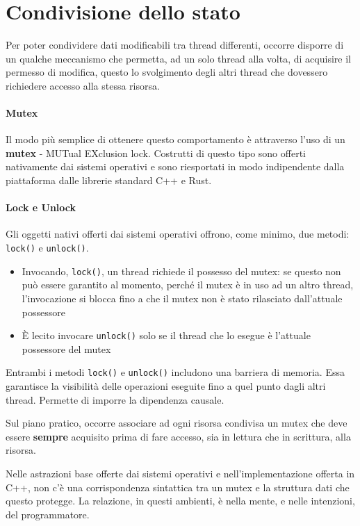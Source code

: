 \section{Condivisione dello stato}

Per poter condividere dati modificabili tra thread differenti, occorre disporre
di un qualche meccanismo che permetta, ad un solo thread alla volta, di
acquisire il permesso di modifica, questo lo svolgimento degli altri thread
che dovessero richiedere accesso alla stessa risorsa.


\paragraph{Mutex}
Il modo più semplice di ottenere questo comportamento è attraverso l'uso di un \textbf{mutex} -
MUTual EXclusion lock.
Costrutti di questo tipo sono offerti nativamente dai sistemi operativi e sono
riesportati in modo indipendente dalla piattaforma dalle librerie standard C++ e
Rust.

\paragraph{Lock e Unlock}

Gli oggetti nativi offerti dai sistemi operativi offrono, come minimo, due metodi: \verb|lock()|
e \verb|unlock()|.

\begin{itemize}
  \item Invocando, \verb|lock()|, un thread richiede il possesso del mutex: se questo non
        può essere garantito al momento, perché il mutex è in uso ad un altro thread,
        l'invocazione si blocca fino a che il mutex non è stato rilasciato
        dall'attuale possessore
  \item È lecito invocare \verb|unlock()| solo se il thread che lo esegue è
        l'attuale possessore del mutex
\end{itemize}


Entrambi i metodi \verb|lock()| e \verb|unlock()| includono una barriera di memoria.
Essa garantisce la visibilità delle operazioni eseguite fino a quel punto dagli
altri thread. Permette di imporre la dipendenza causale.

Sul piano pratico, occorre associare ad ogni risorsa condivisa un mutex che deve essere
\textbf{sempre} acquisito prima di fare accesso, sia in lettura che in scrittura, alla risorsa.


Nelle astrazioni base offerte dai sistemi operativi e nell'implementazione
offerta in C++, non c'è una corrispondenza sintattica tra un mutex e la
struttura dati che questo protegge. La relazione, in questi ambienti, è nella
mente, e nelle intenzioni, del programmatore.

